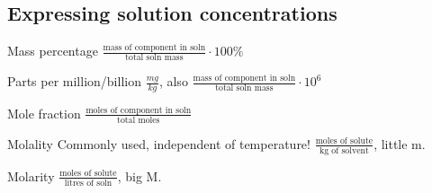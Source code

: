 \begin{mdframed}\subsection{Expressing solution concentrations}
\begin{multicols}{2}\begin{compactdesc}
    \item[Mass percentage]
        $\frac {\text{mass of component in soln}}
               {\text{total soln mass}} \cdot 100\% $
    \item[Parts per million/billion] $ \frac{mg}{kg} $, also
        $\frac {\text{mass of component in soln}}
               {\text{total soln mass}} \cdot 10^6 $
    \item[Mole fraction]
        $\frac {\text{moles of component in soln}}
               {\text{total moles}} $
    \item[Molality] Commonly used, independent of temperature!
        $\frac {\text{moles of solute}}
               {\text{kg of solvent}} $, little m.
    \item[Molarity]
        $\frac {\text{moles of solute}}
               {\text{litres of soln}} $, big M.
\end{compactdesc}\end{multicols}\end{mdframed}


